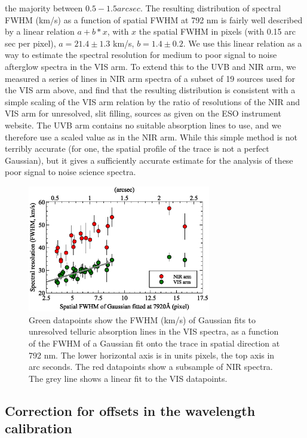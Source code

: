 \documentclass[iop, twocolappendix, numberedappendix, tighten, appendixfloats]{emulateapj}
\begin{document}
	the majority between $0.5-1.5 arcsec$.
	The resulting distribution of spectral FWHM (km/s) as a function of spatial
	FWHM at 792 nm is fairly well described by a linear relation $a + b*x$, with
	$x$ the spatial FWHM in pixels (with 0.15 arc sec per pixel),  $a= 21.4 \pm
	1.3$ km/s, $b=1.4 \pm 0.2$.
	We use this linear relation as a way to estimate the spectral resolution for
	medium to poor signal to noise afterglow spectra in the VIS arm.
	To extend this to the UVB and NIR arm, we measured a series of lines in NIR arm
	spectra of a subset of 19 sources used for the VIS arm above, and find that the
	resulting distribution is consistent with a simple scaling of the VIS arm
	relation by the ratio of resolutions of the NIR and VIS arm for unresolved,
	slit filling, sources as given on the ESO instrument website.
	The UVB arm contains no suitable absorption lines to use, and we therefore use
	a scaled value as in the NIR arm.
	While this simple method is not terribly accurate (for one, the spatial profile
	of the trace is not a perfect Gaussian), but it gives a sufficiently accurate
	estimate for the analysis of these poor signal to noise science spectra.
	

	\begin{figure}
		\centerline{\includegraphics[width=8cm]{figures/resolution_paper.eps}}
		\caption{Green datapoints show the FWHM (km/s) of Gaussian fits to unresolved telluric absorption lines in the VIS spectra, as a function of the FWHM of a Gaussian fit onto the trace in spatial direction at  792 nm. The lower horizontal axis is in units pixels, the top axis in arc seconds. The red datapoints show a subsample of NIR spectra.
			The grey line shows a linear fit to the VIS datapoints. }
		\label{fig:res}
	\end{figure}
	
	\subsection{Correction for offsets in the wavelength calibration}    
	
\end{document}
